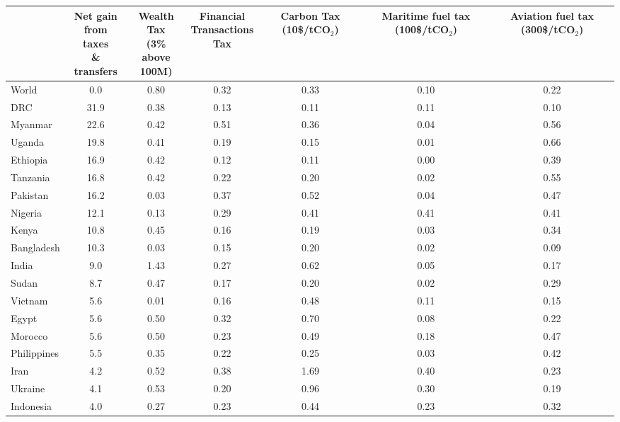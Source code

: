 
\begin{tabular}[t]{lcccccc}
\toprule
  & \makecell{Net gain\\from taxes\\\& transfers} & \makecell{Wealth Tax\\(3\% above\\100M)} & \makecell{Financial\\Transactions\\Tax} & \makecell{Carbon\\Tax\\(10\$/tCO$_\text{2}$)} & \makecell{Maritime\\fuel tax\\(100\$/tCO$_\text{2}$)} & \makecell{Aviation\\fuel tax\\(300\$/tCO$_\text{2}$)}\\
\midrule
World & 0.0 & 0.80 & 0.32 & 0.33 & 0.10 & 0.22\\ \midrule
DRC & 31.9 & 0.38 & 0.13 & 0.11 & 0.11 & 0.10\\
Myanmar & 22.6 & 0.42 & 0.51 & 0.36 & 0.04 & 0.56\\
Uganda & 19.8 & 0.41 & 0.19 & 0.15 & 0.01 & 0.66\\
Ethiopia & 16.9 & 0.42 & 0.12 & 0.11 & 0.00 & 0.39\\
Tanzania & 16.8 & 0.42 & 0.22 & 0.20 & 0.02 & 0.55\\
Pakistan & 16.2 & 0.03 & 0.37 & 0.52 & 0.04 & 0.47\\
Nigeria & 12.1 & 0.13 & 0.29 & 0.41 & 0.41 & 0.41\\
Kenya & 10.8 & 0.45 & 0.16 & 0.19 & 0.03 & 0.34\\
Bangladesh & 10.3 & 0.03 & 0.15 & 0.20 & 0.02 & 0.09\\
India & 9.0 & 1.43 & 0.27 & 0.62 & 0.05 & 0.17\\
Sudan & 8.7 & 0.47 & 0.17 & 0.20 & 0.02 & 0.29\\
Vietnam & 5.6 & 0.01 & 0.16 & 0.48 & 0.11 & 0.15\\
Egypt & 5.6 & 0.50 & 0.32 & 0.70 & 0.08 & 0.22\\
Morocco & 5.6 & 0.50 & 0.23 & 0.49 & 0.18 & 0.47\\
Philippines & 5.5 & 0.35 & 0.22 & 0.25 & 0.03 & 0.42\\
Iran & 4.2 & 0.52 & 0.38 & 1.69 & 0.40 & 0.23\\
Ukraine & 4.1 & 0.53 & 0.20 & 0.96 & 0.30 & 0.19\\
Indonesia & 4.0 & 0.27 & 0.23 & 0.44 & 0.23 & 0.32\\

\end{tabular}

